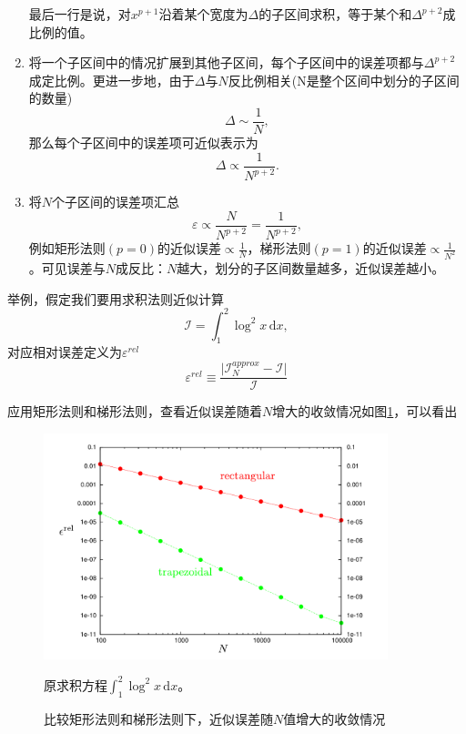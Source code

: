 \begin{enumerate}
\begin{equation*}
  \end{equation*}
  最后一行是说，对$x^{p+1}$沿着某个宽度为$\Delta$的子区间求积，等于某个和$\Delta^{p+2}$成比例的值。
  \item 将一个子区间中的情况扩展到其他子区间，每个子区间中的误差项都与$\Delta^{p+2}$成定比例。更进一步地，由于$\Delta$与$N$反比例相关(N是整个区间中划分的子区间的数量)
  \begin{equation*}
    \Delta \sim \frac{1}{N},
  \end{equation*}
  那么每个子区间中的误差项可近似表示为
  \begin{equation*}
    \Delta \propto \frac{1}{N^{p+2}}.
  \end{equation*}
  \item 将$N$个子区间的误差项汇总
  \begin{equation}
    \varepsilon \propto \frac{N}{N^{p+2}} =  \frac{1}{N^{p+2}},
  \end{equation}
  例如矩形法则$(p=0)$的近似误差$\propto \frac{1}{N}$，梯形法则$(p=1)$的近似误差$\propto \frac{1}{N^{2}}$。可见误差与$N$成反比：$N$越大，划分的子区间数量越多，近似误差越小。
\end{enumerate}

举例，假定我们要用求积法则近似计算
\begin{equation*}
  \mathcal{I} = \int_{1}^{2} \log^{2} x \, \mathrm{d} x,
\end{equation*}
对应相对误差定义为$\varepsilon^{rel}$
\begin{equation*}
  \varepsilon^{rel} \equiv \frac{
  \big| \mathcal{I}_{N}^{approx} - \mathcal{I} \big|
  }{
  \mathcal{I}
  }
\end{equation*}

应用矩形法则和梯形法则，查看近似误差随着$N$增大的收敛情况如图\ref{fig:ninc-nc-error-convergence}，可以看出

\begin{figure}[htbp]
   \caption{比较矩形法则和梯形法则下，近似误差随$N$值增大的收敛情况}
  \centering
  \includegraphics[width=10cm]{./Figures/20180227-nc-higher-error-convergence.png}
  \label{fig:ninc-nc-error-convergence}

  \small{原求积方程$\int_{1}^{2} \log^{2} x \, \mathrm{d} x$。}
\end{figure}

